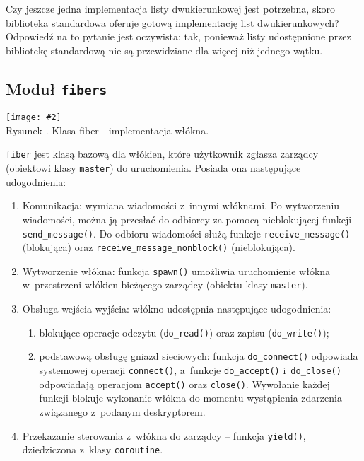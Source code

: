 \documentclass[12pt]{mwart}
\newcommand{\code}{\texttt}
\newcommand{\procbr}{()}
\newcommand{\function}[1]{\code{#1\procbr}}
\newcounter{figmain}
\newcommand{\myownfigure}[4]{ \newcounter{#1} \setcounter{#1}{\value{figmain}} \addtocounter{figmain}{1} \begin{center} \label{fig:#1} \centering \texttt{[image: \#2]}\\ \nopagebreak[4] Rysunek \arabic{#1}. #3. \end{center}}
\begin{document}
\par
\indent
  Czy jeszcze jedna implementacja listy dwukierunkowej jest potrzebna, skoro biblioteka standardowa
  oferuje gotową implementację list dwukierunkowych? Odpowiedź na to pytanie jest oczywista: tak, ponieważ listy
  udostępnione przez bibliotekę standardową nie są przewidziane dla więcej niż jednego wątku.
\par
%
\subsection{Moduł \code{fibers}}
\label{sec:fibers}
    \myownfigure{Fiber}{Fiber.png}{Klasa fiber - implementacja włókna}{.7}
%
\indent
  \code{fiber} jest klasą bazową dla włókien, które użytkownik zgłasza zarządcy (obiektowi klasy \code{master}) do uruchomienia.
  Posiada ona następujące udogodnienia:
  \begin{enumerate}
    \item Komunikacja: wymiana wiadomości z~innymi włóknami. Po wytworzeniu wiadomości, można ją przesłać do odbiorcy za pomocą nieblokującej funkcji \function{send\_message}.
    Do odbioru wiadomości służą funkcje \linebreak \function{receive\_message} (blokująca) oraz \function{receive\_message\_nonblock} (nieblokująca).
    \item Wytworzenie włókna: funkcja \function{spawn} umożliwia uruchomienie włókna w~przestrzeni włókien bieżącego zarządcy (obiektu klasy \code{master}).
    \item Obsługa wejścia-wyjścia: włókno udostępnia następujące udogodnienia:
      \begin{enumerate}
        \item blokujące operacje odczytu (\function{do\_read}) oraz zapisu (\function{do\_write});
        \item podstawową obsługę gniazd sieciowych: funkcja \function{do\_connect} odpowiada systemowej operacji \function{connect}, a~funkcje \function{do\_accept} 
          \linebreak i~\function{do\_close} odpowiadają operacjom \function{accept} oraz \function{close}. Wywołanie każdej funkcji blokuje wykonanie włókna do momentu wystąpienia  
          zdarzenia związanego z~podanym deskryptorem.
      \end{enumerate}
    \item Przekazanie sterowania z~włókna do zarządcy -- funkcja \function{yield}, dziedziczona z~klasy \code{coroutine}.
  \end{enumerate}
\end{document}

